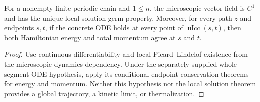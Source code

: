 \begin{theorem}
\label{thm:physics:microscopic_dynamics:target}
For a nonempty finite periodic chain and $1\le n$, the microscopic vector field
is $C^1$ and has the unique local solution-germ property.  Moreover, for every
path $z$ and endpoints $s,t$, if the concrete ODE holds at every point of
$\operatorname{uIcc}(s,t)$, then both Hamiltonian energy and total momentum
agree at $s$ and $t$.
\end{theorem}
\begin{proof}

\leanok
Use continuous differentiability and local Picard--Lindelof existence from the
microscopic-dynamics dependency.  Under the separately supplied whole-segment
ODE hypothesis, apply its conditional endpoint conservation theorems for
energy and momentum.  Neither this hypothesis nor the local solution theorem
provides a global trajectory, a kinetic limit, or thermalization.
\end{proof}
